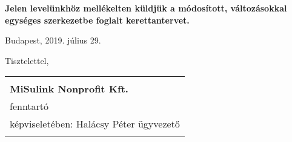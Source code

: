 \noindent
\textbf{Jelen levelünkhöz mellékelten küldjük a módosított, változásokkal egységes szerkezetbe foglalt
      kerettantervet.}

\vspace{0.75cm}

\noindent
Budapest, 2019. július 29.

\vspace{0.75cm}
\noindent
Tisztelettel,

\vspace{0.75cm}
\noindent
\begin{center}
      \begin{tabular}{p{8cm}}
            \begin{center}
                  \hrulefill \\
                  \textbf{MiSulink Nonprofit Kft.} \\
                  fenntartó\\
                  képviseletében: Halácsy Péter ügyvezető \\
            \end{center}
      \end{tabular}
\end{center}
\newpage